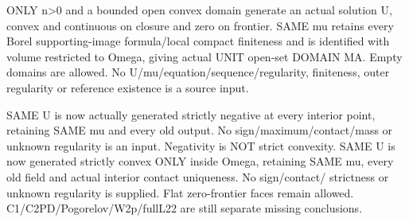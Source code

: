 \begin{lemma}
  \label{lem:dirichlet-unit-solution}
  \leanok
  ONLY n>0 and a bounded open convex domain generate an actual solution U,
  convex and continuous on closure and zero on frontier. SAME mu retains
  every Borel supporting-image formula/local compact finiteness and is
  identified with volume restricted to Omega, giving actual UNIT open-set
  DOMAIN MA. Empty domains are allowed. No U/mu/equation/sequence/regularity,
  finiteness, outer regularity or reference existence is a source input.

  SAME U is now actually generated strictly negative at every interior point,
  retaining SAME mu and every old output. No sign/maximum/contact/mass or
  unknown regularity is an input. Negativity is NOT strict convexity.
  SAME U is now generated strictly convex ONLY inside Omega, retaining SAME mu,
  every old field and actual interior contact uniqueness. No sign/contact/
  strictness or unknown regularity is supplied. Flat zero-frontier faces remain
  allowed. C1/C2PD/Pogorelov/W2p/fullL22 are still separate missing conclusions.
\end{lemma}
